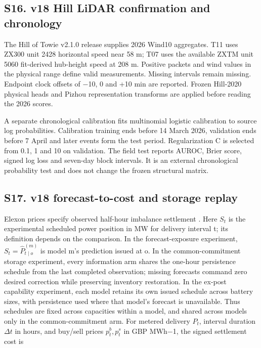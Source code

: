 \documentclass[a4paper,11pt]{article}
\begin{document}
\subsection{S16. v18 Hill LiDAR confirmation and chronology}\label{s16.-v18-hill-lidar-confirmation-and-chronology}

The Hill of Towie v2.1.0 release supplies 2026 Wind10 aggregates. T11 uses ZX300 unit 2428 horizontal speed near 58 m; T07 uses the available ZXTM unit 5060 fit-derived hub-height speed at 208 m. Positive packets and wind values in the physical range define valid measurements. Missing intervals remain missing. Endpoint clock offsets of −10, 0 and +10 min are reported. Frozen Hill-2020 physical heads and Pizhou representation transforms are applied before reading the 2026 scores.

A separate chronological calibration fits multinomial logistic calibration to source log probabilities. Calibration training ends before 14 March 2026, validation ends before 7 April and later events form the test period. Regularization C is selected from 0.1, 1 and 10 on validation. The field test reports AUROC, Brier score, signed log loss and seven-day block intervals. It is an external chronological probability test and does not change the frozen structural matrix.

\subsection{S17. v18 forecast-to-cost and storage replay}\label{s17.-v18-forecast-to-cost-and-storage-replay}

Elexon prices specify observed half-hour imbalance settlement \citep{elexonsettlement}. Here \(S_t\) is the experimental scheduled power position in MW for delivery interval t; its definition depends on the comparison. In the forecast-exposure experiment, \(S_t=\widehat P^{(m)}_{t\mid o}\) is model m's prediction issued at o. In the common-commitment storage experiment, every information arm shares the one-hour persistence schedule from the last completed observation; missing forecasts command zero desired correction while preserving inventory restoration. In the ex-post capability experiment, each model retains its own issued schedule across battery sizes, with persistence used where that model's forecast is unavailable. Thus schedules are fixed across capacities within a model, and shared across models only in the common-commitment arm. For metered delivery \(P_t\), interval duration \(\Delta t\) in hours, and buy/sell prices \(p_t^b,p_t^s\) in GBP MWh−1, the signed settlement cost is
\end{document}
